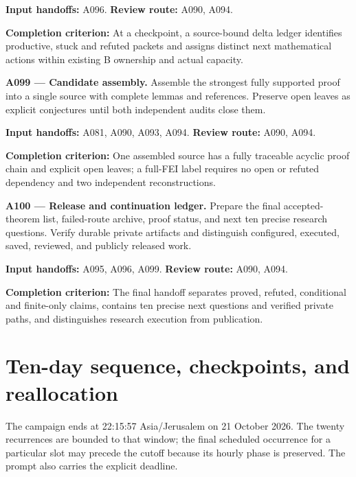 \documentclass[11pt]{article}
\begin{document}
{\small\color{ink}\textbf{Input handoffs:} A096. \textbf{Review route:} A090, A094.\par
\textbf{Completion criterion:} At a checkpoint, a source-bound delta ledger identifies productive, stuck and refuted packets and assigns distinct next mathematical actions within existing B ownership and actual capacity.\par}



\textbf{A099 --- Candidate assembly.} Assemble the strongest fully supported proof into a single source with complete lemmas and references. Preserve open leaves as explicit conjectures until both independent audits close them.

{\small\color{ink}\textbf{Input handoffs:} A081, A090, A093, A094. \textbf{Review route:} A090, A094.\par
\textbf{Completion criterion:} One assembled source has a fully traceable acyclic proof chain and explicit open leaves; a full-FEI label requires no open or refuted dependency and two independent reconstructions.\par}



\textbf{A100 --- Release and continuation ledger.} Prepare the final accepted-theorem list, failed-route archive, proof status, and next ten precise research questions. Verify durable private artifacts and distinguish configured, executed, saved, reviewed, and publicly released work.

{\small\color{ink}\textbf{Input handoffs:} A095, A096, A099. \textbf{Review route:} A090, A094.\par
\textbf{Completion criterion:} The final handoff separates proved, refuted, conditional and finite-only claims, contains ten precise next questions and verified private paths, and distinguishes research execution from publication.\par}



\section{Ten-day sequence, checkpoints, and reallocation}

The campaign ends at 22:15:57 Asia/Jerusalem on 21 October 2026. The twenty recurrences are bounded to that window; the final scheduled occurrence for a particular slot may precede the cutoff because its hourly phase is preserved. The prompt also carries the explicit deadline.
\end{document}

